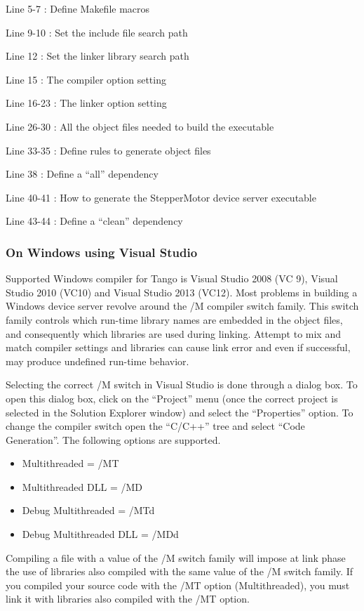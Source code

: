 Line 5-7 : Define Makefile macros

Line 9-10 : Set the include file search path

Line 12 : Set the linker library search path

Line 15 : The compiler option setting

Line 16-23 : The linker option setting

Line 26-30 : All the object files needed to build the executable

Line 33-35 : Define rules to generate object files

Line 38 : Define a ``all'' dependency

Line 40-41 : How to generate the StepperMotor device server executable

Line 43-44 : Define a ``clean'' dependency

\subsubsection{On Windows using Visual Studio\label{Compiling NT}}

Supported Windows compiler for Tango is Visual Studio
2008 (VC 9), Visual Studio 2010 (VC10) and Visual Studio 2013 (VC12).
Most problems in building a Windows device server revolve around the
/M compiler switch family. This switch family controls which run-time
library names are embedded in the object files, and consequently which
libraries are used during linking. Attempt to mix
and match compiler settings and libraries can cause link error and
even if successful, may produce undefined run-time behavior.

Selecting the correct /M switch in Visual Studio is done through a
dialog box. To open this dialog box, click on the ``Project'' menu
(once the correct project is selected in the Solution Explorer window)
and select the ``Properties'' option. To change the compiler switch
open the ``C/C++'' tree and select ``Code Generation''. The following
options are supported.
\begin{itemize}
\item Multithreaded = /MT
\item Multithreaded DLL = /MD
\item Debug Multithreaded = /MTd
\item Debug Multithreaded DLL = /MDd
\end{itemize}
Compiling a file with a value of the /M switch family will impose
at link phase the use of libraries also compiled with the same value
of the /M switch family. If you compiled your source code with the
/MT option (Multithreaded), you must link it with libraries also compiled
with the /MT option.

